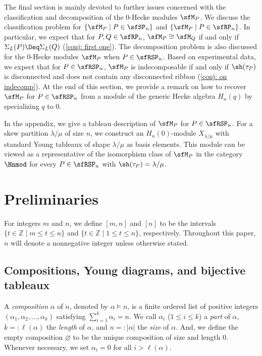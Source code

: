 \documentclass[12pt, reqno]{amsart}
\theoremstyle{definition}
\numberwithin{equation}{section} \numberwithin{figure}{section}
\numberwithin{table}{section}
\begin{document}
The final section is mainly devoted to further issues concerned with the classification and decomposition of the $0$-Hecke modules $\sfM_P$.
We discuss the classification problem for $\{\sfM_P \mid P \in \sfSP_n\}$ and $\{\sfM_P \mid P \in \sfRP_n\}$.
In particular, we expect that for $P, Q \in \sfRP_n$,
$\sfM_P \cong \sfM_Q$  if and only if  
$\Sigma_L(P) \Deq \Sigma_L(Q)$
(\cref{conj: first one}). 
The decomposition problem is also discussed for the $0$-Hecke modules $\sfM_P$ when $P \in \sfRSP_n$.
Based on experimental data, we expect that for $P \in \sfRSP_n$,
$\sfM_P$ is indecomposable if and only if $\sh(\tau_P)$ is disconnected and does not contain any disconnected ribbon
(\cref{conj: on indecomp}).
At the end of this section, we provide a remark on how to recover $\sfM_P$ for $P \in \sfRSP_n$ from a module of the generic Hecke algebra $H_n(q)$ by specializing $q$ to $0$.

In the appendix, we give a tableau description of $\sfM_P$ for $P \in \sfRSP_n$.
For a skew partition $\lambda/\mu$ of size $n$, we construct an $H_n(0)$-module $X_{\lambda/\mu}$ with standard Young tableaux of shape $\lambda/\mu$ as basis elements.
This module can be viewed as a representative of the isomorphism class of $\sfM_P$  in the category $\Hnmod$ for every $P \in \sfRSP_n$ with $\sh(\tau_P) = \lambda/\mu$. 











\section{Preliminaries}\label{sec: preliminary}

For integers $m$ and $n$, we define $[m,n]$ and $[n]$ to be the intervals $\{t\in \mathbb Z \mid m\le t \le n\}$ and $\{t\in \mathbb Z \mid 1\le t \le n\}$, respectively.
Throughout this paper, $n$ will denote a nonnegative integer unless otherwise stated. 


\subsection{Compositions, Young diagrams, and bijective tableaux}\label{subsec: comp and diag}

A \emph{composition} $\alpha$ of $n$, denoted by $\alpha \models n$, is a finite ordered list of positive integers $(\alpha_1,\alpha_2,\ldots, \alpha_k)$ satisfying $\sum_{i=1}^k \alpha_i = n$.
We call $\alpha_i$ ($1 \le i \le k$) a \emph{part} of $\alpha$, $k =: \ell(\alpha)$ the \emph{length} of $\alpha$, and $n =:|\alpha|$ the \emph{size} of $\alpha$. 
And, we define the empty composition $\varnothing$ to be the unique composition of size and length $0$.
Whenever necessary, we set $\alpha_i = 0$ for all $i > \ell(\alpha)$.
\end{document}
